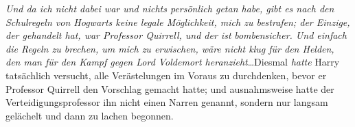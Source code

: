 \emph{Und da ich nicht dabei war und nichts persönlich getan habe, gibt es nach den Schulregeln von Hogwarts keine legale Möglichkeit, mich zu bestrafen; der Einzige, der gehandelt hat, war Professor Quirrell, und der ist} \emph{bombensicher. Und einfach die Regeln zu brechen, um mich zu erwischen, wäre nicht klug für den Helden, den man für den Kampf gegen Lord Voldemort heranzieht}…Diesmal \emph{hatte} Harry tatsächlich versucht, alle Verästelungen im Voraus zu durchdenken, bevor er Professor Quirrell den Vorschlag gemacht hatte; und ausnahmsweise hatte der Verteidigungsprofessor ihn nicht einen Narren genannt, sondern nur langsam gelächelt und dann zu lachen begonnen.

